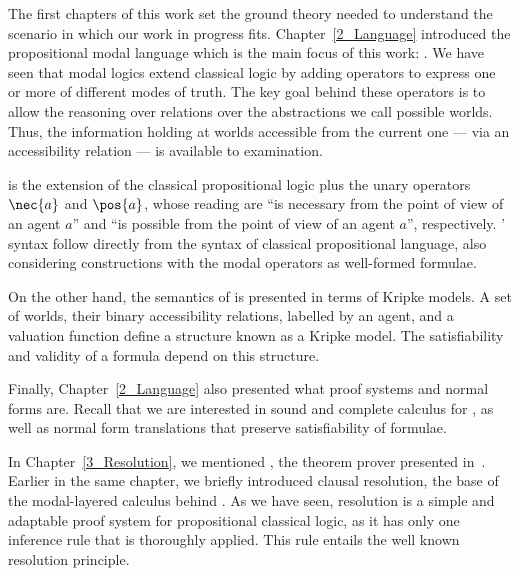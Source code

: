 
The first chapters of this work set the ground theory needed to understand the
scenario in which our work in progress fits. Chapter~\ref{2_Language}
introduced the propositional modal language which is the main focus of this
work: . We have seen that modal logics extend classical logic by
adding operators to express one or more of different modes of truth.  The key
goal behind these operators is to allow the reasoning over relations over the
abstractions we call possible worlds. Thus, the information holding at worlds
accessible from the current one --- via an accessibility relation --- is
available to examination.  

 is the extension of the classical propositional logic plus the
unary operators $\nec{a}$ and $\pos{a}$, whose reading are ``is necessary from
the point of view of an agent $a$'' and ``is possible from the point of view of
an agent $a$'', respectively. ' syntax follow directly from the
syntax of classical propositional language, also considering constructions with
the modal operators as well-formed formulae.

On the other hand, the semantics of  is presented in terms of
Kripke models. A set of worlds, their binary accessibility relations, labelled
by an agent, and a valuation function define a structure known as a Kripke
model. The satisfiability and validity of a formula depend on this
structure.

Finally, Chapter~\ref{2_Language} also presented what proof systems and normal
forms are. Recall that we are interested in sound and complete calculus for
, as well as normal form translations that preserve
satisfiability of formulae.

In Chapter~\ref{3_Resolution}, we mentioned \ksp, the theorem prover presented
in~\cite{Nalon2016}. Earlier in the same chapter, we briefly introduced clausal
resolution, the base of the modal-layered calculus behind \ksp. As we have seen,
resolution is a simple and adaptable proof system for propositional classical
logic, as it has only one inference rule that is thoroughly applied. This rule
entails the well known resolution principle.

